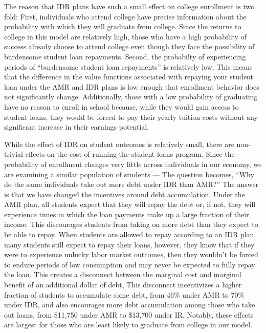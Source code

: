   The reason that IDR plans have such a small effect on college enrollment is two fold: First,
  individuals who attend college have precise information about the probability with which they will
  graduate from college. Since the returns to college in this model are relatively high, those who
  have a high probability of success already choose to attend college even though they face the
  possibility of burdensome student loan repayments. Second, the probabilty of experiencing periods
  of ``burdensome student loan repayments'' is relatively low. This means that the difference in the
  value functions associated with repaying your student loan under the AMR and IDR plans is low
  enough that enrollment behavior does not significantly change. Additionally, those with a low
  probability of graduating have no reason to enroll in school because, while they would gain access
  to student loans, they would be forced to pay their yearly tuition costs without any significant
  increase in their earnings potential.

  While the effect of IDR on student outcomes is relatively small, there are non-trivial effects on
  the cost of running the student loans program. Since the probability of enrollment changes very
  little across individuals in our economy, we are examining a similar population of students ---
  The question becomes, ``Why do the same individuals take out more debt under IDR than AMR?'' The
  answer is that we have changed the incentives around debt accumulation. Under the AMR plan, all
  students expect that they will repay the debt or, if not, they will experience times in which the
  loan payments make up a large fraction of their income. This discourages students from taking on
  more debt than they expect to be able to repay. When students are allowed to repay according to an
  IDR plan, many students still expect to repay their loans, however, they know that if they were to
  experience unlucky labor market outcomes, then they wouldn't be forced to endure periods of low
  consumption and may never be expected to fully repay the loan. This creates a disconnect between
  the marginal cost and marginal benefit of an additional dollar of debt, This disconnect
  incentivizes a higher fraction of students to accumulate some debt, from 46\% under AMR to 70\%
  under IDR, and also encourages more debt accumulation among those who take out loans, from
  \$11,750 under AMR to \$13,700 under IR. Notably, these effects are largest for those who are
  least likely to graduate from college in our model.

